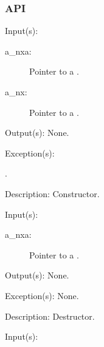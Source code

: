 \subsubsection{API}
\begin{capi}
\label{nxa_new}
	\begin{capilist}
	\item[Input(s): ]
		\begin{description}\item[]
		\item[a\_nxa: ]
			Pointer to a .
		\item[a\_nx: ]
			Pointer to a .
		\end{description}
	\item[Output(s): ] None.
	\item[Exception(s): ]
		\begin{description}\item[]
		\item[.]
		\end{description}
	\item[Description: ]
		Constructor.
	\end{capilist}
\label{nxa_delete}
	\begin{capilist}
	\item[Input(s): ]
		\begin{description}\item[]
		\item[a\_nxa: ]
			Pointer to a \classname{nxa}.
		\end{description}
	\item[Output(s): ] None.
	\item[Exception(s): ] None.
	\item[Description: ]
		Destructor.
	\end{capilist}
\label{nxa_malloc_e}
\label{nxa_malloc}
	\begin{capilist}
	\item[Input(s): ]
		\begin{description}\item[]

\end{description}
\end{capilist}
\end{capi}
